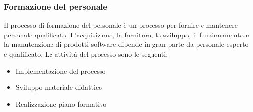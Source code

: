 \subsubsection{Formazione del personale}
Il processo di formazione del personale è un processo per fornire e mantenere personale qualificato. L'acquisizione, la fornitura, lo sviluppo, il funzionamento o la manutenzione di prodotti software dipende in gran parte da personale esperto e qualificato.
Le attività del processo sono le seguenti:
\begin{itemize}
\item Implementazione del processo
\item Sviluppo materiale didattico
\item Realizzazione piano formativo
\end{itemize}
